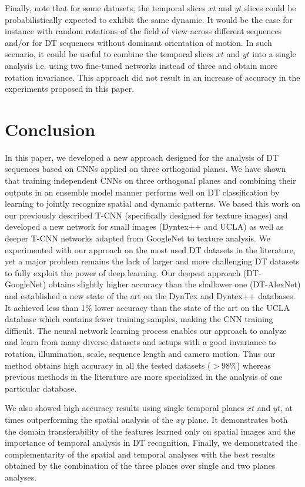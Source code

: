\documentclass[a4paper,11pt]{article}
\begin{document}
Finally, note that for some datasets, the temporal slices $xt$ and $yt$ slices could be probabilistically expected to exhibit the same dynamic.
It would be the case for instance with random rotations of the field of view across different sequences and/or for DT sequences without dominant orientation of motion.
In such scenario, it could be useful to combine the temporal slices $xt$ and $yt$ into a single analysis i.e. using two fine-tuned networks instead of three and obtain more rotation invariance.
This approach did not result in an increase of accuracy in the experiments proposed in this paper.

\section{Conclusion}
In this paper, we developed a new approach designed for the analysis of DT sequences based on CNNs applied on three orthogonal planes.
We  have shown that training independent CNNs on three orthogonal planes and combining their outputs in an ensemble model
manner performs well on DT classification by learning to jointly recognize spatial and dynamic patterns.
We based this work on our previously described T-CNN (specifically designed for texture images) and developed a new network for
small images (Dyntex++ and UCLA) as well as deeper T-CNN networks adapted from GoogleNet to texture analysis.
We experimented with our approach on the most used DT datasets in the literature,
yet a major problem remains the lack of larger and more challenging DT datasets to fully exploit the power of deep learning.
Our deepest approach (DT-GoogleNet) obtains slightly higher accuracy than the shallower one (DT-AlexNet) and established a new state of the art on
the DynTex and Dyntex++ databases.
It achieved less than 1\% lower accuracy than the state of the art on the UCLA database which contains fewer training samples,
making the CNN training difficult.
The neural network learning process enables our approach to analyze and learn from many diverse datasets and setups with a good invariance to rotation,
illumination, scale, sequence length and camera motion.
Thus our method obtains high accuracy in all the tested datasets ($>$98\%) whereas previous methods in the literature are more specialized in the
analysis of one particular database.

We also showed high accuracy results using single temporal planes $xt$ and $yt$, at times outperforming the spatial analysis of the $xy$ plane.
It demonstrates both the domain transferability of the features learned only on spatial images and the importance of temporal analysis in DT recognition.
Finally, we demonstrated the complementarity of the spatial and temporal analyses with the best results obtained by the combination of the three planes
over single and two planes analyses. 
\end{document}
